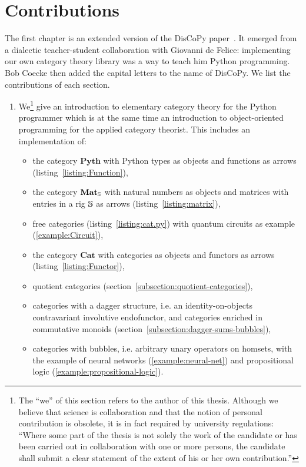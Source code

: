 
\section*{Contributions}

The first chapter is an extended version of the DisCoPy paper~\cite{FeliceEtAl20a}.
It emerged from a dialectic teacher-student collaboration with Giovanni de Felice: implementing our own category theory library was a way to teach him Python programming.
Bob Coecke then added the capital letters to the name of DisCoPy.
We list the contributions of each section.

\begin{enumerate}
\item We\footnote
{The ``we'' of this section refers to the author of this thesis.
Although we believe that science is collaboration and that the notion of personal contribution is obsolete, it is in fact required by university regulations: ``Where some part of the thesis is not solely the work of the candidate or has been carried out in collaboration with one or more persons, the candidate shall submit a clear statement of the extent of his or her own contribution.''}
give an introduction to elementary category theory for the Python programmer which is at the same time an introduction to object-oriented programming for the applied category theorist.
This includes an implementation of:
\begin{itemize}
    \item the category $\mathbf{Pyth}$ with Python types as objects and functions as arrows (listing~\ref{listing:Function}),
    \item the category $\mathbf{Mat}_\S$ with natural numbers as objects and matrices with entries in a rig $\S$ as arrows (listing~\ref{listing:matrix}),
    \item free categories (listing~\ref{listing:cat.py}) with quantum circuits as example (\ref{example:Circuit}),
    \item the category $\mathbf{Cat}$ with categories as objects and functors as arrows (listing~\ref{listing:Functor}),
    \item quotient categories (section~\ref{subsection:quotient-categories}),
    \item categories with a dagger structure, i.e. an identity-on-objects contravariant involutive endofunctor, and categories enriched in commutative monoids (section~\ref{subsection:dagger-sums-bubbles}),
    \item categories with bubbles, i.e. arbitrary unary operators on homsets, with the example of neural networks (\ref{example:neural-net}) and propositional logic (\ref{example:propositional-logic}).
\end{itemize}


\end{enumerate}
